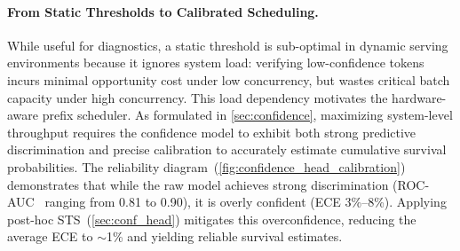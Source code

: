 \paragraph{From Static Thresholds to Calibrated Scheduling.}
While useful for diagnostics, a static threshold is sub-optimal in dynamic serving environments because it ignores system load: verifying low-confidence tokens incurs minimal opportunity cost under low concurrency, but wastes critical batch capacity under high concurrency. This load dependency motivates the hardware-aware prefix scheduler. As formulated in \autoref{sec:confidence}, maximizing system-level throughput requires the confidence model to exhibit both strong predictive discrimination and precise calibration to accurately estimate cumulative survival probabilities. The reliability diagram~(\autoref{fig:confidence_head_calibration}) demonstrates that while the raw model achieves strong discrimination (ROC-AUC~\citep{hanley1982meaning} ranging from 0.81 to 0.90), it is overly confident (ECE 3\%--8\%). Applying post-hoc STS~(\autoref{sec:conf_head}) mitigates this overconfidence, reducing the average ECE to $\sim$1\% and yielding reliable survival estimates.
